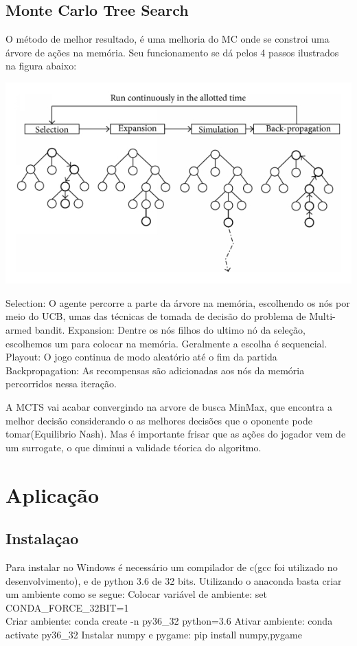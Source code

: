 \documentclass[]{book}
\begin{document}
\section{Monte Carlo Tree Search}\label{monte-carlo-tree-search}

O método de melhor resultado, é uma melhoria do MC onde se constroi uma
árvore de ações na memória. Seu funcionamento se dá pelos 4 passos
ilustrados na figura abaixo:

\begin{center}\includegraphics[width=0.5\linewidth]{content/imgs/MCTS} \end{center}

Selection: O agente percorre a parte da árvore na memória, escolhendo os
nós por meio do UCB, umas das técnicas de tomada de decisão do problema
de Multi-armed bandit. Expansion: Dentre os nós filhos do ultimo nó da
seleção, escolhemos um para colocar na memória. Geralmente a escolha é
sequencial. Playout: O jogo continua de modo aleatório até o fim da
partida Backpropagation: As recompensas são adicionadas aos nós da
memória percorridos nessa iteração.

A MCTS vai acabar convergindo na arvore de busca MinMax, que encontra a
melhor decisão considerando o as melhores decisões que o oponente pode
tomar(Equilibrio Nash). Mas é importante frisar que as ações do jogador
vem de um surrogate, o que diminui a validade téorica do algoritmo.

\chapter{Aplicação}\label{app}

\section{Instalaçao}\label{instalauxe7ao}

Para instalar no Windows é necessário um compilador de c(gcc foi
utilizado no desenvolvimento), e de python 3.6 de 32 bits. Utilizando o
anaconda basta criar um ambiente como se segue: Colocar variável de
ambiente: set CONDA\_FORCE\_32BIT=1\\
Criar ambiente: conda create -n py36\_32 python=3.6 Ativar ambiente:
conda activate py36\_32 Instalar numpy e pygame: pip install
numpy,pygame
\end{document}
